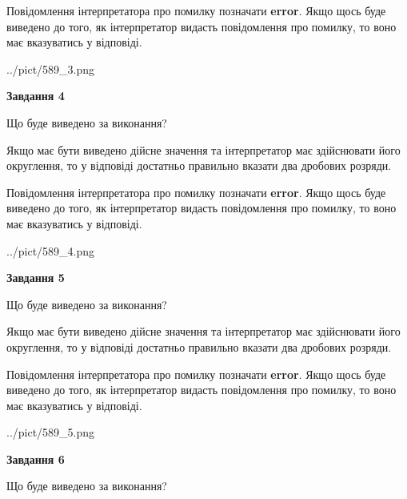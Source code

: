 \documentclass[12pt, ukrainian]{article}
\begin{document}
{\begin {Large}
Повідомлення інтерпретатора про помилку позначати \textbf{error}.
Якщо щось буде виведено до того, як інтерпретатор видасть повідомлення про помилку, 
то воно має вказуватись у відповіді. \par

\begin{center}
	{../pict/589_3.png}
\end{center}
\newpage

{\begin {center}\textbf{Завдання 4}\end {center}}\par
Що буде виведено за виконання? \par

Якщо має бути виведено дійсне значення та інтерпретатор має здійснювати його округлення, 
то у відповіді достатньо правильно вказати два дробових розряди.

Повідомлення інтерпретатора про помилку позначати \textbf{error}.
Якщо щось буде виведено до того, як інтерпретатор видасть повідомлення про помилку, 
то воно має вказуватись у відповіді. \par

\begin{center}
	{../pict/589_4.png}
\end{center}
\newpage

{\begin {center}\textbf{Завдання 5}\end {center}}\par
Що буде виведено за виконання? \par

Якщо має бути виведено дійсне значення та інтерпретатор має здійснювати його округлення, 
то у відповіді достатньо правильно вказати два дробових розряди.

Повідомлення інтерпретатора про помилку позначати \textbf{error}.
Якщо щось буде виведено до того, як інтерпретатор видасть повідомлення про помилку, 
то воно має вказуватись у відповіді. \par

\begin{center}
	{../pict/589_5.png}
\end{center}
\newpage

{\begin {center}\textbf{Завдання 6}\end {center}}\par
Що буде виведено за виконання? \par


\end{Large}}
\end{document}
